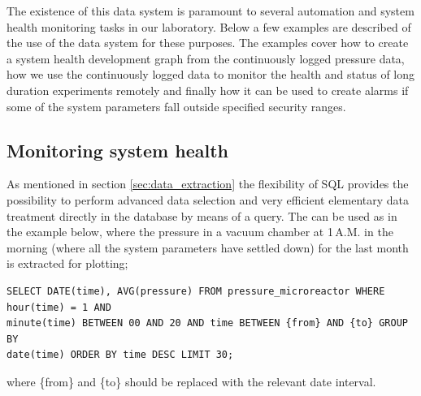 The existence of this data system is paramount to several automation and system
health monitoring tasks in our laboratory. Below a few examples are described
of the use of the data system for these purposes. The examples cover how to
create a system health development graph from the continuously logged pressure
data, how we use the continuously logged data to monitor the health and status
of long duration experiments remotely and finally how it can be used to create
alarms if some of the system parameters fall outside specified security ranges.

\subsection{Monitoring system health}
\label{sec:morning_pressure}
As mentioned in section \ref{sec:data_extraction} the flexibility of SQL
provides the possibility to perform advanced data selection and very efficient
elementary data treatment directly in the database by means of a query.
The can be used as in the example below, where the pressure in a vacuum
chamber at 1\,A.M. in the morning (where all the system parameters have settled
down) for the last month is extracted for plotting; 

\begin{verbatim} 
SELECT DATE(time), AVG(pressure) FROM pressure_microreactor WHERE hour(time) = 1 AND
minute(time) BETWEEN 00 AND 20 AND time BETWEEN {from} AND {to} GROUP BY
date(time) ORDER BY time DESC LIMIT 30; \end{verbatim} 

where \{from\} and \{to\} should be replaced with the relevant date interval.

